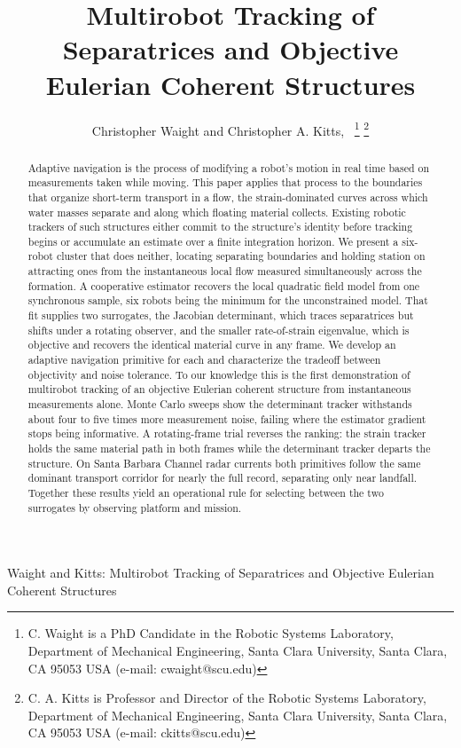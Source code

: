 \documentclass[lettersize,journal]{IEEEtran}
\begin{document}
\title{Multirobot Tracking of Separatrices and
Objective Eulerian Coherent Structures}

\author{Christopher Waight and Christopher A. Kitts,~
\thanks{C. Waight is a PhD Candidate in the Robotic Systems Laboratory, Department of Mechanical Engineering, Santa Clara University, Santa Clara, CA 95053 USA (e-mail: cwaight@scu.edu)}
\thanks{C. A. Kitts is Professor and Director of the Robotic Systems Laboratory, Department of Mechanical Engineering, Santa Clara University, Santa Clara, CA 95053 USA (e-mail: ckitts@scu.edu)}
}
%
{Waight and Kitts: Multirobot Tracking of Separatrices and Objective Eulerian Coherent Structures}

\maketitle

\begin{abstract}
Adaptive navigation is the process of modifying a robot's motion in
real time based on measurements taken while moving. This paper applies
that process to the boundaries that organize short-term transport in a
flow, the strain-dominated curves across which water masses separate
and along which floating material collects. Existing robotic trackers
of such structures either commit to the structure's identity before
tracking begins or accumulate an estimate over a finite integration
horizon. We present a six-robot cluster that does neither, locating
separating boundaries and holding station on attracting ones from the
instantaneous local flow measured simultaneously across the formation.
A cooperative estimator recovers the local quadratic field model from
one synchronous sample, six robots being the minimum for the
unconstrained model. That fit supplies two surrogates, the Jacobian
determinant, which traces separatrices but shifts under a rotating
observer, and the smaller rate-of-strain eigenvalue, which is objective
and recovers the identical material curve in any frame. We develop an
adaptive navigation primitive for each and characterize the tradeoff
between objectivity and noise tolerance. To our knowledge this is the
first demonstration of multirobot tracking of an objective Eulerian
coherent structure from instantaneous measurements alone. Monte Carlo
sweeps show the determinant tracker withstands about four to five times
more measurement noise, failing where the estimator gradient stops
being informative. A rotating-frame trial reverses the ranking: the
strain tracker holds the same material path in both frames while the
determinant tracker departs the structure. On Santa Barbara Channel
radar currents both primitives follow the same dominant transport
corridor for nearly the full record, separating only near landfall.
Together these results yield an operational rule for selecting between
the two surrogates by observing platform and mission.
\end{abstract}
\end{document}
